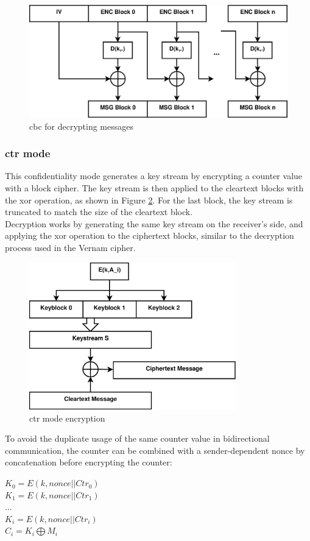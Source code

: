 \begin{figure}
    \centering
    \includegraphics[width=1\textwidth]{figures/CBCdecrypt.eps}
    \caption{\gls{cbc} for decrypting messages}
    \label{fig:cbc_decrypt}
\end{figure}

\subsubsection{\gls{ctr} mode}

This confidentiality mode generates a key stream by encrypting a counter value with a block cipher. The key stream is then applied to the cleartext
blocks with the \gls{xor} operation, as shown in Figure \ref{fig:ctr}. For the last block, the key stream is truncated to match the size of the cleartext block.
\\
Decryption works by generating the same key stream on the receiver's side, and applying the \gls{xor} operation to the ciphertext blocks, similar to the
decryption process used in the Vernam cipher.
\begin{figure}
    \centering
    \includegraphics[width=0.8\textwidth]{figures/CTR.eps}
    \caption{\gls{ctr} mode encryption}
    \label{fig:ctr}
\end{figure}
To avoid the duplicate usage of the same counter value in bidirectional communication, the counter can be combined with a sender-dependent nonce by
concatenation before encrypting the counter:
\begin{center}
 $K_{0} = E(k, nonce || Ctr_0)$\\
 $K_{1} = E(k, nonce || Ctr_1)$\\
 ...\\
 $K_{i} = E(k, nonce || Ctr_i)$\\
 $C_i = K_i \bigoplus M_i$
\end{center}
 
